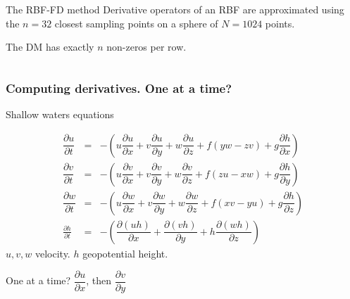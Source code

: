 \documentclass{beamer}
\begin{document}
\begin{frame}[fragile]
\begin{columns}
\begin{block}{The RBF-FD method}
      Derivative operators of an RBF are approximated using the $n=32$
      closest sampling points on a sphere of $N=1024$ points.

      The DM has exactly $n$ non-zeros per row.
    \end{block}
    
  \end{columns}
\end{frame}


\begin{frame}
  \frametitle{Computing derivatives. One at a time?}
  
  \begin{block}{Shallow waters equations}
    
    \begin{eqnarray}
      \dfrac{\partial u}{\partial t} &=& - \left( u\dfrac{\partial u}{\partial x} + v\dfrac{\partial u}{\partial y} + w\dfrac{\partial u}{\partial z} + f(yw - zv) + g\dfrac{\partial h}{\partial x} \right) 
      \nonumber \\
      \dfrac{\partial v}{\partial t} &=& - \left( u\dfrac{\partial v}{\partial x} + v\dfrac{\partial v}{\partial y} + w\dfrac{\partial v}{\partial z} + f(zu - xw) + g\dfrac{\partial h}{\partial y} \right)
      \nonumber\\
      \dfrac{\partial w}{\partial t} &=& - \left( u\dfrac{\partial w}{\partial x} + v\dfrac{\partial w}{\partial y} + w\dfrac{\partial w}{\partial z} + f(xv - yu) + g\dfrac{\partial h}{\partial z} \right) 
      \nonumber\\
      \frac{\partial h}{\partial t} &=& -\left(\dfrac{\partial (uh)}{\partial x} + \dfrac{\partial (vh)}{\partial y} + h\dfrac{\partial (wh)}{\partial z}\right)  \nonumber
    \end{eqnarray}
    $u,v,w$ velocity. $h$ geopotential height.
  \end{block}
  
  One at a time? $\dfrac{\partial u}{\partial x}$, then $\dfrac{\partial v}{\partial y}$

  

\end{frame}
\end{document}
